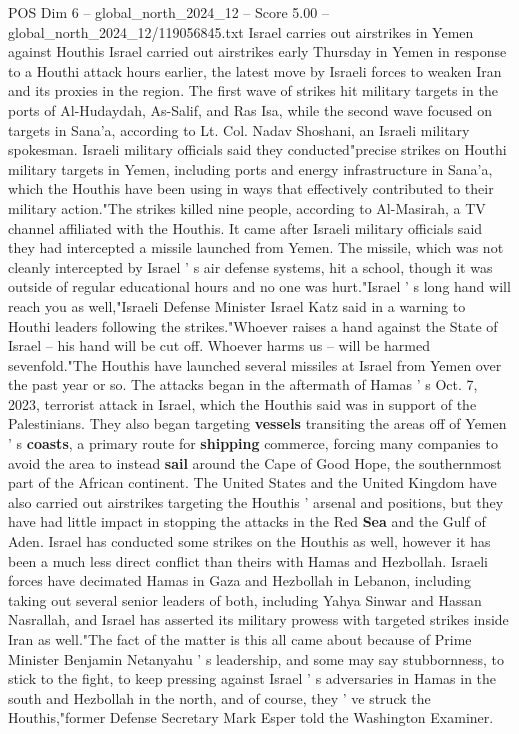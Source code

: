 \begin{textsample}{POS Dim 6 – global\_north\_2024\_12 – Score 5.00 – global\_north\_2024\_12/119056845.txt}  \label{ex:f6_pos_263}
Israel carries out airstrikes in Yemen against Houthis Israel carried out airstrikes early Thursday in Yemen in response to a Houthi attack hours earlier, the latest move by Israeli forces to weaken Iran and its proxies in the region.
The first wave of strikes hit military targets in the ports of Al-Hudaydah, As-Salif, and Ras Isa, while the second wave focused on targets in Sana'a, according to Lt.
Col.
Nadav Shoshani, an Israeli military spokesman.
Israeli military officials said they conducted"precise strikes on Houthi military targets in Yemen, including ports and energy infrastructure in Sana'a, which the Houthis have been using in ways that effectively contributed to their military action."The strikes killed nine people, according to Al-Masirah, a TV channel affiliated with the Houthis.
It came after Israeli military officials said they had intercepted a missile launched from Yemen.
The missile, which was not cleanly intercepted by Israel ' s air defense systems, hit a school, though it was outside of regular educational hours and no one was hurt."Israel ' s long hand will reach you as well,"Israeli Defense Minister Israel Katz said in a warning to Houthi leaders following the strikes."Whoever raises a hand against the State of Israel -- his hand will be cut off.
Whoever harms us -- will be harmed sevenfold."The Houthis have launched several missiles at Israel from Yemen over the past year or so.
The attacks began in the aftermath of Hamas ' s Oct. 7, 2023, terrorist attack in Israel, which the Houthis said was in support of the Palestinians.
They also began targeting \textbf{vessels} transiting the areas off of Yemen ' s \textbf{coasts}, a primary route for \textbf{shipping} commerce, forcing many companies to avoid the area to instead \textbf{sail} around the Cape of Good Hope, the southernmost part of the African continent.
The United States and the United Kingdom have also carried out airstrikes targeting the Houthis ' arsenal and positions, but they have had little impact in stopping the attacks in the Red \textbf{Sea} and the Gulf of Aden.
Israel has conducted some strikes on the Houthis as well, however it has been a much less direct conflict than theirs with Hamas and Hezbollah.
Israeli forces have decimated Hamas in Gaza and Hezbollah in Lebanon, including taking out several senior leaders of both, including Yahya Sinwar and Hassan Nasrallah, and Israel has asserted its military prowess with targeted strikes inside Iran as well."The fact of the matter is this all came about because of Prime Minister Benjamin Netanyahu ' s leadership, and some may say stubbornness, to stick to the fight, to keep pressing against Israel ' s adversaries in Hamas in the south and Hezbollah in the north, and of course, they ' ve struck the Houthis,"former Defense Secretary Mark Esper told the Washington Examiner.

\end{textsample}
